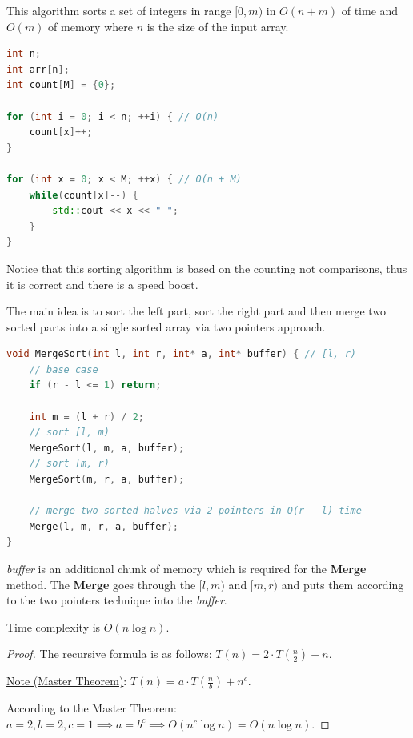 This algorithm sorts a set of integers in range $[0, m)$ in $O(n + m)$ of time and $O(m)$ of memory where $n$ is the size of the input array.

\begin{lstlisting}[language=C++]
int n;
int arr[n];
int count[M] = {0};

for (int i = 0; i < n; ++i) { // O(n)
    count[x]++;
}

for (int x = 0; x < M; ++x) { // O(n + M)
    while(count[x]--) {
        std::cout << x << " ";
    }
}

\end{lstlisting}

Notice that this sorting algorithm is based on the counting not comparisons, thus it is correct and there is a speed boost.



The main idea is to sort the left part, sort the right part and then merge two sorted parts into a single sorted array via two pointers approach.


\begin{lstlisting}[language=C++]
void MergeSort(int l, int r, int* a, int* buffer) { // [l, r)
    // base case
    if (r - l <= 1) return;

    int m = (l + r) / 2;
    // sort [l, m)
    MergeSort(l, m, a, buffer);
    // sort [m, r)
    MergeSort(m, r, a, buffer);

    // merge two sorted halves via 2 pointers in O(r - l) time
    Merge(l, m, r, a, buffer);
}
\end{lstlisting}

\textit{buffer} is an additional chunk of memory which is required for the \textbf{Merge} method. The \textbf{Merge} goes through the $[l, m)$ and $[m, r)$ and puts them according to the two pointers technique into the \textit{buffer}.

\begin{lemma}

    Time complexity is $O(n \log{n})$.

\end{lemma}

\begin{proof}
    The recursive formula is as follows: $T(n) = 2 \cdot T(\frac{n}{2}) + n$.

    \underline{Note (Master Theorem)}: $T(n) = a \cdot T(\frac{n}{b}) + n^c$.

    According to the Master Theorem: $a = 2, b = 2, c = 1 \implies a = b^c \implies O(n^c \log{n}) = O(n \log{n})$.

\end{proof}

